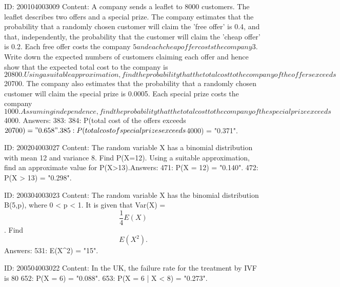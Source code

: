 \documentclass{article}
\begin{document}
ID: 200104003009
Content:
A company sends a leaflet to 8000 customers. The leaflet describes two offers and a special prize. The company estimates that the probability that a randomly chosen customer will claim the 'free offer' is 0.4, and that, independently, the probability that the customer will claim the 'cheap offer' is 0.2. Each free offer costs the company $5 and each cheap offer costs the company $3. Write down the expected numbers of customers claiming each offer and hence show that the expected total cost to the company is $20800. Using a suitable approximation, find the probability that the total cost to the company of the offers exceeds $20700. The company also estimates that the probability that a randomly chosen customer will claim the special prize is 0.0005. Each special prize costs the company $1000. Assuming independence, find the probability that the total cost to the company of the special prize exceeds $4000. Answers:
383: 
384: P(total cost of the offers exceeds $20700) = "0.658".
385: P(total cost of special prizes exceeds $4000) = "0.371".

ID: 200204003027
Content:
The random variable X has a binomial distribution with mean 12 and variance 8. Find P(X=12). Using a suitable approximation, find an approximate value for P(X>13).Answers:
471: P(X = 12) = "0.140".
472: P(X > 13) = "0.298".

ID: 200304003023
Content:
The random variable X has the binomial distribution B(5,p), where 0 < p < 1. It is given that Var(X) = $$\frac{1}{4}E(X)$$. Find $$E(X^2).$$Answers:
531: E(X^2) = "15".

ID: 200504003022
Content:
In the UK, the failure rate for the treatment by IVF is 80%
652: P(X = 6) = "0.088".
653: P(X = 6 | X < 8) = "0.273".
\end{document}
